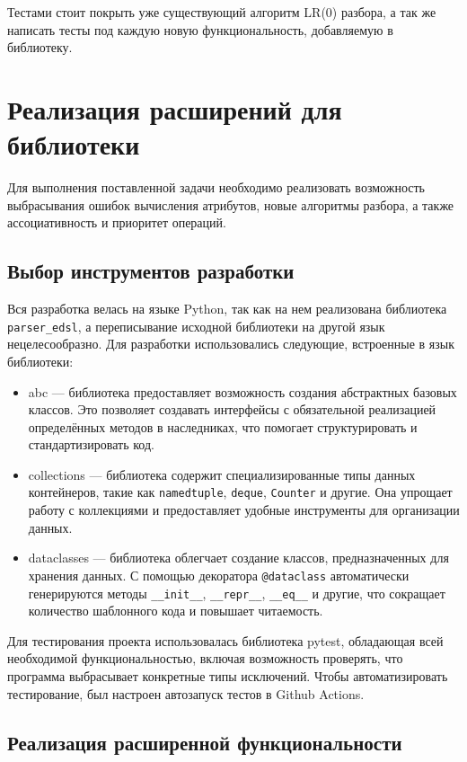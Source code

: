 \documentclass[14pt, russian]{scrartcl}
\begin{document}
Тестами стоит покрыть уже существующий алгоритм LR(0) разбора, а так же написать тесты под каждую новую функциональность,
добавляемую в библиотеку.

\section{Реализация расширений для библиотеки}

Для выполнения поставленной задачи необходимо реализовать возможность выбрасывания ошибок вычисления атрибутов,
новые алгоритмы разбора, а также ассоциативность и приоритет операций.

\subsection{Выбор инструментов разработки}

Вся разработка велась на языке Python, так как на нем реализована библиотека \texttt{parser\_edsl}, а переписывание
исходной библиотеки на другой язык нецелесообразно. Для разработки использовались следующие, встроенные в
язык библиотеки:

\begin{itemize}
	\item abc --- библиотека предоставляет возможность создания абстрактных базовых классов. Это позволяет
	создавать интерфейсы с обязательной реализацией определённых методов в
	наследниках, что помогает структурировать и стандартизировать код.
	\item collections --- библиотека содержит специализированные типы данных контейнеров, такие как
	\texttt{namedtuple}, \texttt{deque}, \texttt{Counter} и другие. Она упрощает работу с коллекциями и
	предоставляет удобные инструменты для организации данных.
	\item dataclasses --- библиотека облегчает создание классов, предназначенных для хранения данных. С помощью
	декоратора \texttt{@dataclass} автоматически генерируются методы \texttt{\_\_init\_\_}, \texttt{\_\_repr\_\_},
	\texttt{\_\_eq\_\_} и другие, что сокращает количество шаблонного кода и повышает читаемость.
\end{itemize}

Для тестирования проекта использовалась библиотека pytest, обладающая всей необходимой функциональностью, включая
возможность проверять, что программа выбрасывает конкретные типы исключений. Чтобы автоматизировать тестирование,
был настроен автозапуск тестов в Github Actions.

\subsection{Реализация расширенной функциональности}
\end{document}
